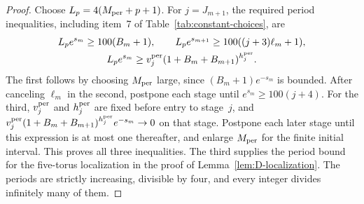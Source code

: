 \begin{proof}
Choose $L_p=4(M_{\rm per}+p+1)$. For $j=J_{m+1}$, the required period inequalities, including item~7 of Table~\ref{tab:constant-choices}, are
\begin{gather*}
 L_p e^{s_m}\ge100(B_m+1),\qquad
 L_p e^{s_{m+1}}\ge100((j+3)\ell_m+1),\\
 L_p e^{s_m}\ge v_j^{\rm per}(1+B_m+B_{m+1})^{h_j^{\rm per}}.
\end{gather*}
The first follows by choosing $M_{\rm per}$ large, since $(B_m+1)e^{-s_m}$ is bounded. After canceling $\ell_m$ in the second, postpone each stage until $e^{s_m}\ge100(j+4)$. For the third, $v_j^{\rm per}$ and $h_j^{\rm per}$ are fixed before entry to stage~$j$, and $v_j^{\rm per}(1+B_m+B_{m+1})^{h_j^{\rm per}}e^{-s_m}\to0$ on that stage. Postpone each later stage until this expression is at most one thereafter, and enlarge $M_{\rm per}$ for the finite initial interval. This proves all three inequalities. The third supplies the period bound for the five-torus localization in the proof of Lemma~\ref{lem:D-localization}. The periods are strictly increasing, divisible by four, and every integer divides infinitely many of them.
\end{proof}

